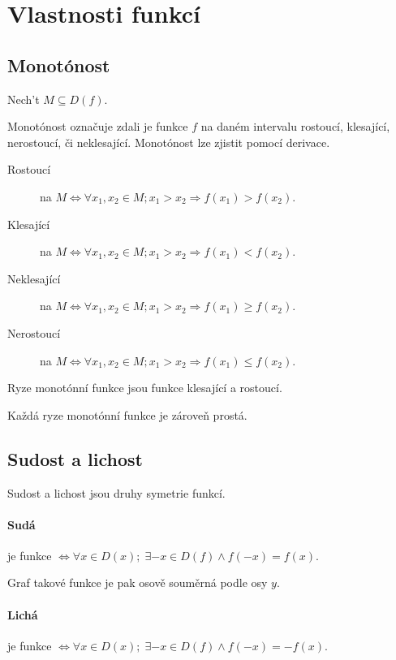 \documentclass[12pt,a4wide,oneside,
headings]{report}
\begin{document}
\section{Vlastnosti funkcí }

\subsection{Monotónost}

Nech't $M\subseteq D(f)$.

Monotónost označuje zdali je funkce $f$ na daném intervalu rostoucí, klesající, nerostoucí, či neklesající. Monotónost lze zjistit pomocí derivace.

\begin{description}
\item[Rostoucí] na $M \Leftrightarrow \forall x_1,x_2\in M; x_1>x_2\Rightarrow f(x_1)>f(x_2)$.
\item[Klesající] na $M \Leftrightarrow \forall x_1,x_2\in M; x_1>x_2\Rightarrow f(x_1)<f(x_2)$.
\item[Neklesající] na $M \Leftrightarrow \forall x_1,x_2\in M; x_1>x_2\Rightarrow f(x_1)\geq f(x_2)$.
\item[Nerostoucí] na $M \Leftrightarrow \forall x_1,x_2\in M; x_1>x_2\Rightarrow f(x_1)\leq f(x_2)$.
\end{description}

Ryze monotónní funkce jsou funkce klesající a rostoucí.

Každá ryze monotónní funkce je zároveň prostá.

\subsection{Sudost a lichost}

Sudost a lichost jsou druhy symetrie funkcí.

\paragraph{Sudá} je funkce $\Leftrightarrow \forall x \in D(x);\; \exists -x \in D(f) \wedge f(-x)=f(x)$.

Graf takové funkce je pak osově souměrná podle osy $y$.

\paragraph{Lichá} je funkce $\Leftrightarrow \forall x \in D(x);\; \exists -x \in D(f) \wedge f(-x)=-f(x)$.
\end{document}
